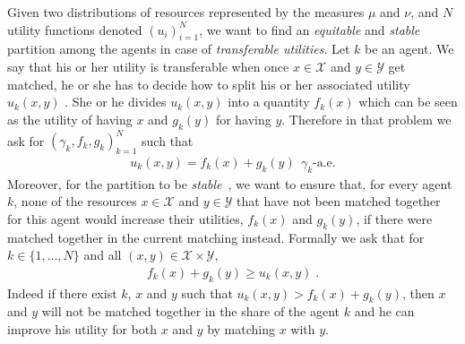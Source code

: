 Given two distributions of resources represented by the measures $\mu$ and $\nu$, and $N$ utility functions denoted $(u_i)_{i=1}^N$, we want to find an \emph{equitable} and \emph{stable} partition among the agents in case of \emph{transferable utilities}. Let $k$ be an agent. We say that his or her utility is transferable when once $x\in\mathcal{X}$ and $y\in\mathcal{Y}$ get matched, he or she has to decide how to split his or her associated utility $u_k(x,y)$ . She or he divides $u_k(x,y)$ into a quantity $f_k(x)$ which can be seen as the utility of having $x$ and $g_k(y)$ for having $y$. Therefore in that problem we ask for $(\gamma_k,f_k,g_k)_{k=1}^N$ such that
\begin{align}
\label{eq-1-dual}
    u_k(x,y)=f_k(x)+g_k(y) ~~\gamma_{k}\text{-a.e.} 
\end{align}
Moreover, for the partition to be \emph{stable}~\citep{rothm}, we want to ensure that, for every agent $k$, none of the resources $x\in\mathcal{X}$ and $y\in\mathcal{Y}$ that have not been matched together for this agent would increase their utilities, $f_k(x)$ and $g_k(y)$, if there were matched together in the current matching instead. Formally we ask that for $k\in\{1,\dots,N\}$ and all $(x,y)\in\mathcal{X}\times\mathcal{Y}$,
\begin{align}
\label{eq-2-dual}
    f_k(x)+g_k(y)\geq u_k(x,y)\; .
\end{align}
Indeed if there exist $k$, $x$ and $y$ such that $u_k(x,y)>f_k(x)+g_k(y)$, then $x$ and $y$ will not be matched together in the share of the agent $k$ and he can improve his utility for both $x$ and $y$ by matching $x$ with $y$. 

